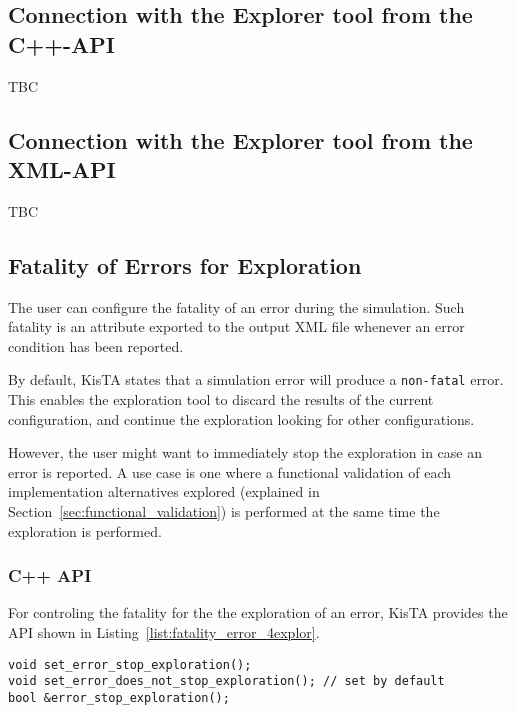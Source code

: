 

\subsection{Connection with the Explorer tool from the C++-API}
\label{sec:conn_from_cpp_api}

TBC

\subsection{Connection with the Explorer tool from the XML-API}
\label{sec:conn_from_cpp_api}

TBC

\subsection{Fatality of Errors for Exploration}
\label{sec:error_fatality_for_exploration}

The user can configure the fatality of an error during the simulation.
Such fatality is an attribute exported to the output XML file whenever 
an error condition has been reported.

By default, KisTA states that a simulation error will produce a \texttt{non-fatal} error.
%
This enables the exploration tool to discard the results of the current configuration, 
and continue the exploration looking for other configurations.

However, the user might want to immediately stop the exploration in case
an error is reported. 
%
A use case is one where a functional validation of each
implementation alternatives explored (explained in Section~\ref{sec:functional_validation})
is performed at the same time the exploration is performed.
%

\subsubsection{C++ API}
\label{sec:error_fatality_for_exploration}

For controling the fatality for the the exploration of an error,
KisTA provides the API shown in Listing~\ref{list:fatality_error_4explor}.

\begin{lstlisting}[style=KistaCodeStyle,caption={API for controling the fatality for the exploration of an error.},label=list:fatality_error_4explor]
void set_error_stop_exploration();
void set_error_does_not_stop_exploration(); // set by default
bool &error_stop_exploration();
\end{lstlisting}

